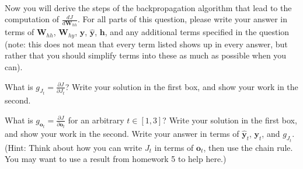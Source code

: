 \documentclass[11pt,addpoints,answers]{exam}
\newcommand{\hv}{\mathbf{h}}
\newcommand{\ov}{\mathbf{o}}
\newcommand{\yv}{\mathbf{y}}
\newcommand{\Wv}{\mathbf{W}}
\begin{document}
\begin{questions}
\begin{parts}
\begin{subparts}
\begin{center}
\end{center}
    \begin{your_solution}[title=(a),height=2cm,width=6cm]
    \end{your_solution}
     \begin{your_solution}[title=(b),height=2cm,width=6cm]
    \end{your_solution}\\
     \begin{your_solution}[title=(c),height=2cm,width=6cm]
    \end{your_solution}
     \begin{your_solution}[title=(d),height=2cm,width=6cm]
    \end{your_solution}

\subpart Now you will derive the steps of the backpropagation algorithm that lead to the computation of $\frac{dJ}{d\Wv_{hh}}$. For all parts of this question, please write your answer in terms of $\Wv_{hh}$, $\Wv_{hy}$, $\yv$, $\hat{\yv}$, $\hv$, and any additional terms specified in the question (note: this does not mean that every term listed shows up in every answer, but rather that you should simplify terms into these as much as possible when you can).
\clearpage
    \begin{subsubparts}
        \subsubpart[2] What is $g_{J_t} = \frac{\partial J}{\partial J_t}$? Write your solution in the first box, and show your work in the second.
        
    \begin{your_solution}[title=$\frac{\partial J}{\partial J_t}$,height=2.5cm,width=8.5cm]
    \end{your_solution}
    
    \begin{your_solution}[title=Work,height=6cm,width=14cm]
    \end{your_solution}

     \subsubpart[2] What is $g_{\ov_t} = \frac{\partial J}{\partial \ov_t}$ for an arbitrary $t \in [1,3]$? Write your solution in the first box, and show your work in the second. Write your answer in terms of $\hat{\yv}_t$, $\yv_t$, and $g_{J_t}$. (Hint: Think about how you can write $J_t$ in terms of $\ov_t$, then use the chain rule. You may want to use a result from homework 5 to help here.)
        
    \begin{your_solution}[title=$\frac{\partial J}{\partial \ov_t}$,height=2.5cm,width=8.5cm]
    \end{your_solution}
    

\end{subsubparts}
\end{subparts}
\end{parts}
\end{questions}
\end{document}
